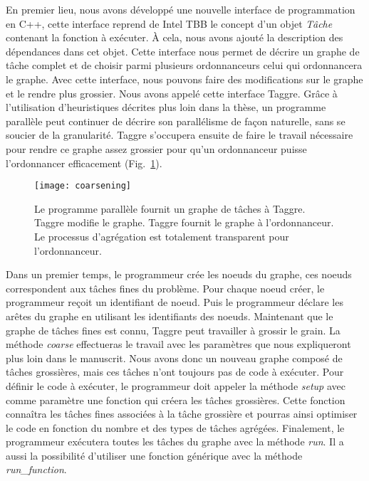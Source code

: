 En premier lieu, nous avons développé une nouvelle interface de programmation en C++, cette interface reprend de Intel TBB le concept d'un objet {\em Tâche} contenant la fonction à exécuter.
%
\`A cela, nous avons ajouté la description des dépendances dans cet objet.
%
Cette interface nous permet de décrire un graphe de tâche complet et de choisir parmi plusieurs ordonnanceurs celui qui ordonnancera le graphe.
%
Avec cette interface, nous pouvons faire des modifications sur le graphe et le rendre plus grossier.
%
Nous avons appelé cette interface Taggre.
%
Grâce à l'utilisation d'heuristiques décrites plus loin dans la thèse, un programme parallèle peut continuer de décrire son parallélisme de façon naturelle, sans se soucier de la granularité.
%
Taggre s'occupera ensuite de faire le travail nécessaire pour rendre ce graphe assez grossier pour qu'un ordonnanceur puisse l'ordonnancer efficacement (Fig.~\ref{fig:coarsening}).

\begin{figure}
  \centering
  \texttt{[image: coarsening]}
  \caption{Le programme parallèle fournit un graphe de tâches à Taggre. Taggre modifie le graphe. Taggre fournit le graphe à l'ordonnanceur. Le processus d'agrégation est totalement transparent pour l'ordonnanceur.}
  \label{fig:coarsening}
\end{figure}




Dans un premier temps, le programmeur crée les noeuds du graphe, ces noeuds correspondent aux tâches fines du problème.
%
Pour chaque noeud créer, le programmeur reçoit un identifiant de noeud.
%
Puis le programmeur déclare les arêtes du graphe en utilisant les identifiants des noeuds.
%
Maintenant que le graphe de tâches fines est connu, Taggre peut travailler à grossir le grain.
%
La méthode {\em coarse} effectueras le travail avec les paramètres que nous expliqueront plus loin dans le manuscrit.
%
Nous avons donc un nouveau graphe composé de tâches grossières, mais ces tâches n'ont toujours pas de code à exécuter.
%
Pour définir le code à exécuter, le programmeur doit appeler la méthode {\em setup} avec comme paramètre une fonction qui créera les tâches grossières.
%
Cette fonction connaîtra les tâches fines associées à la tâche grossière et pourras ainsi optimiser le code en fonction du nombre et des types de tâches agrégées.
%
Finalement, le programmeur exécutera toutes les tâches du graphe avec la méthode {\em run}.
%
Il a aussi la possibilité d'utiliser une fonction générique avec la méthode {\em run\_function}.
